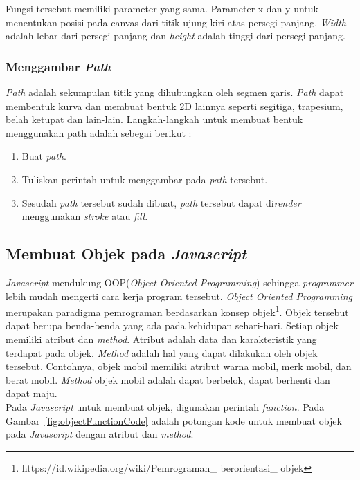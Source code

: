 Fungsi tersebut memiliki parameter yang sama. Parameter x dan y untuk menentukan posisi pada canvas dari titik ujung kiri atas persegi panjang. \textit{Width} adalah lebar dari persegi panjang dan \textit{height} adalah tinggi dari persegi panjang.

\subsubsection{Menggambar \textit{Path}}
\textit{Path} adalah sekumpulan titik yang dihubungkan oleh segmen garis. \textit{Path} dapat membentuk kurva dan membuat bentuk 2D lainnya seperti segitiga, trapesium, belah ketupat dan lain-lain. Langkah-langkah untuk membuat bentuk menggunakan path adalah sebegai berikut : 

\begin{enumerate}
	\item Buat \textit{path}.
	\item Tuliskan perintah untuk menggambar pada \textit{path} tersebut.
	\item Sesudah \textit{path} tersebut sudah dibuat, \textit{path} tersebut dapat di\textit{render} menggunakan \textit{stroke} atau \textit{fill}.
\end{enumerate}



\subsection{Membuat Objek pada \textit{Javascript}}
\textit{Javascript} mendukung OOP(\textit{Object Oriented Programming}) sehingga \textit{programmer} lebih mudah mengerti cara kerja program tersebut. \textit{Object Oriented Programming} merupakan paradigma pemrograman berdasarkan konsep objek\footnote{https://id.wikipedia.org/wiki/Pemrograman\_ berorientasi\_ objek}. Objek tersebut dapat berupa benda-benda yang ada pada kehidupan sehari-hari. Setiap objek memiliki atribut dan \textit{method}. Atribut adalah data dan karakteristik yang terdapat pada objek. \textit{Method} adalah hal yang dapat dilakukan oleh objek tersebut. Contohnya, objek mobil memiliki atribut warna mobil, merk mobil, dan berat mobil. \textit{Method} objek mobil adalah dapat berbelok, dapat berhenti dan dapat maju. \\

Pada \textit{Javascript} untuk membuat objek, digunakan perintah \textit{function}. Pada Gambar~\ref{fig:objectFunctionCode} adalah potongan kode untuk membuat objek pada \textit{Javascript} dengan atribut dan \textit{method}.

